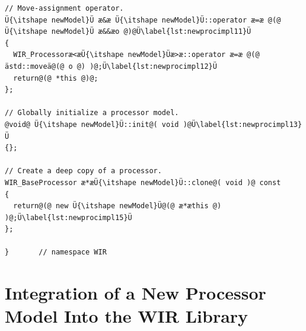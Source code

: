 \begin{lstlisting}[style=code,float=!t,caption={Rudimentary Implementation of a New Processor Model's Class},label=lst:newprocimpl]
// Move-assignment operator.
Ü{\itshape newModel}Ü æ&æ Ü{\itshape newModel}Ü::operator æ=æ @(@ Ü{\itshape newModel}Ü æ&&æo @)@Ü\label{lst:newprocimpl11}Ü
{
  WIR_Processoræ<æÜ{\itshape newModel}Üæ>æ::operator æ=æ @(@ ästd::moveä@(@ o @) )@;Ü\label{lst:newprocimpl12}Ü
  return@(@ *this @)@;
};

// Globally initialize a processor model.
@void@ Ü{\itshape newModel}Ü::init@( void )@Ü\label{lst:newprocimpl13}Ü
{};

// Create a deep copy of a processor.
WIR_BaseProcessor æ*æÜ{\itshape newModel}Ü::clone@( void )@ const
{
  return@(@ new Ü{\itshape newModel}Ü@(@ æ*æthis @) )@;Ü\label{lst:newprocimpl15}Ü
};

}       // namespace WIR
\end{lstlisting}


\section{Integration of a New Processor Model Into the WIR Library}
\label{sec:newprocinit}


